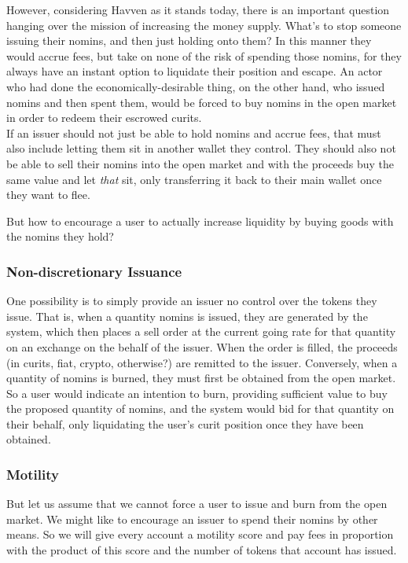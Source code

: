 \documentclass{article}
\begin{document}
However, considering Havven as it stands today, there is an important question hanging over the 
mission of increasing the money supply.
What's to stop someone issuing their nomins, and then just holding onto them? In this manner they
would accrue fees, but take on none of the risk of spending those nomins, for they always have an instant
option to liquidate their position and escape. An actor who had done the economically-desirable thing, on
the other hand, who issued nomins and then spent them, would be forced to buy nomins in the open market in
order to redeem their escrowed curits. \\

If an issuer should not just be able to hold nomins and accrue fees, that must also include
letting them sit in another wallet they control. They should also not be able to sell their nomins
into the open market and with the proceeds buy the same value and let \textit{that} sit,
only transferring it back to their main wallet once they want to flee.

But how to encourage a user to actually increase liquidity by buying goods with the nomins they hold? 

\subsubsection{Non-discretionary Issuance}

One possibility is to simply provide an issuer no control over the tokens they issue.
That is, when a quantity nomins is issued, they are generated by the system, which then places a
sell order at the current going rate for that quantity on an exchange on the behalf of the issuer.
When the order is filled, the proceeds (in curits, fiat, crypto, otherwise?) are remitted to the issuer.
Conversely, when a quantity of nomins is burned, they must first be obtained from the open market.
So a user would indicate an intention to burn, providing sufficient value to buy the proposed quantity
of nomins, and the system would bid for that quantity on their behalf, only liquidating the user's
curit position once they have been obtained.

\subsubsection{Motility}

But let us assume that we cannot force a user to issue and burn from the open market.
We might like to encourage an issuer to spend their nomins by other means. So we will give every
account a motility score and pay fees in proportion with the product of this score and the
number of tokens that account has issued.
\end{document}
